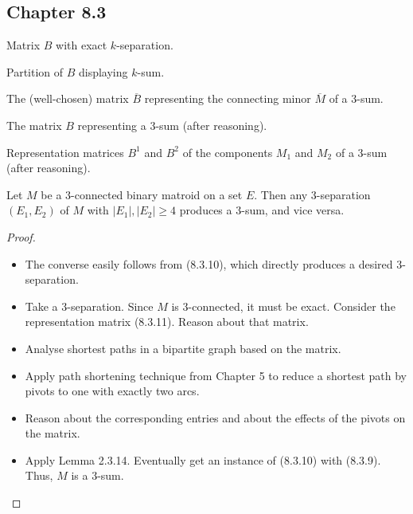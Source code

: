 \subsection{Chapter 8.3}

\begin{proposition}[8.3.1]
  \label{prop:8.3.1}
  Matrix $B$ with exact $k$-separation.
\end{proposition}

\begin{proposition}[8.3.2]
  \label{prop:8.3.2}
  Partition of $B$ displaying $k$-sum.
\end{proposition}

\begin{proposition}[8.3.9]
  \label{prop:8.3.9}
  The (well-chosen) matrix $\overline{B}$ representing the connecting minor $\overline{M}$ of a $3$-sum.
\end{proposition}

\begin{proposition}[8.3.10]
  \label{prop:8.3.10}
  The matrix $B$ representing a $3$-sum (after reasoning).
\end{proposition}

\begin{proposition}[8.3.11]
  \label{prop:8.3.11}
  Representation matrices $B^{1}$ and $B^{2}$ of the components $M_{1}$ and $M_{2}$ of a $3$-sum (after reasoning).
\end{proposition}

\begin{lemma}[8.3.12]
  \label{lem:8.3.12}
  Let $M$ be a $3$-connected binary matroid on a set $E$. Then any $3$-separation $(E_{1}, E_{2})$ of $M$ with $|E_{1}|, |E_{2}| \geq 4$ produces a $3$-sum, and vice versa.
\end{lemma}

\begin{proof}
  \begin{itemize}
    \item The converse easily follows from (8.3.10), which directly produces a desired $3$-separation.
    \item Take a $3$-separation. Since $M$ is $3$-connected, it must be exact. Consider the representation matrix (8.3.11). Reason about that matrix.
    \item Analyse shortest paths in a bipartite graph based on the matrix.
    \item Apply path shortening technique from Chapter 5 to reduce a shortest path by pivots to one with exactly two arcs.
    \item Reason about the corresponding entries and about the effects of the pivots on the matrix.
    \item Apply Lemma 2.3.14. Eventually get an instance of (8.3.10) with (8.3.9). Thus, $M$ is a $3$-sum.
  \end{itemize}
\end{proof}


